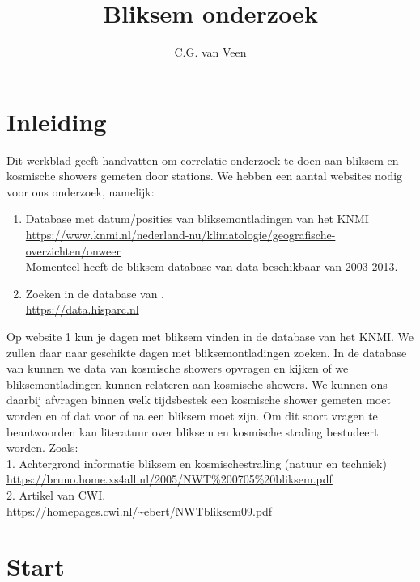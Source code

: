 

\title{Bliksem onderzoek}
\author{C.G. van Veen}



\maketitle

\section{Inleiding}

Dit werkblad geeft handvatten om correlatie onderzoek te doen aan bliksem en
kosmische showers gemeten door \hisparc stations.
We hebben een aantal websites nodig voor ons onderzoek, namelijk:
\begin{enumerate}
    \item Database met datum/posities van bliksemontladingen van het KNMI\\
    \url{https://www.knmi.nl/nederland-nu/klimatologie/geografische-overzichten/onweer} \\
    Momenteel heeft de bliksem database van \hisparc data beschikbaar van 2003-2013.
    \item Zoeken in de database van \hisparc.\\
    \url{https://data.hisparc.nl}
\end{enumerate}

Op website 1 kun je dagen met bliksem vinden in de database van het KNMI.
We zullen daar naar geschikte dagen met bliksemontladingen zoeken.
In de database van \hisparc kunnen we data van kosmische showers opvragen en
kijken of we bliksemontladingen kunnen relateren aan kosmische showers.
We kunnen ons daarbij afvragen binnen welk tijdsbestek een kosmische shower gemeten
moet worden en of dat voor of na een bliksem moet zijn. Om dit soort vragen te
beantwoorden kan literatuur over bliksem en kosmische straling bestudeert worden.
Zoals:\\
1. Achtergrond informatie bliksem en kosmischestraling (natuur en techniek)\\
\url{https://bruno.home.xs4all.nl/2005/NWT%200705%20bliksem.pdf}\\
2. Artikel van CWI.\\
\url{https://homepages.cwi.nl/~ebert/NWTbliksem09.pdf}\\

\section{Start}

